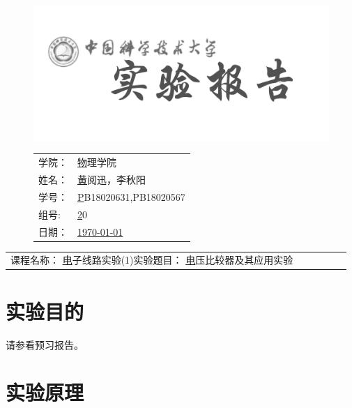 \documentclass[a4paper,11pt,UTF8]{ctexart}
\newcommand{\major}{物理学院}
\newcommand{\name}{黄阅迅，李秋阳}
\newcommand{\stuid}{PB18020631,PB18020567}
\newcommand{\group}{20}
\newcommand{\newdate}{\today}
\newcommand{\course}{电子线路实验(1)}
\newcommand{\newtitle}{电压比较器及其应用实验}
\begin{document}
\thispagestyle{empty}
\begin{figure}[h]
  \begin{minipage}{0.6\linewidth}
    \centerline{\includegraphics[width=\linewidth]{logo.png}}
  \end{minipage}
  \hfill
  \begin{minipage}{.4\linewidth}
    \raggedleft
    \begin{tabular*}{.8\linewidth}{ll}
      学院： & \underline\major   \\
      姓名： & \underline\name    \\
      学号： & \underline\stuid   \\
      组号:  & \underline\group   \\
      日期： & \underline\newdate \\
    \end{tabular*}
  \end{minipage}
\end{figure}

\begin{table}[!htbp]
  \centering
  \begin{tabular*}{\linewidth}{llllll}
    课程名称：  \underline\course   \qquad\qquad 实验题目：  \underline\newtitle  
  \end{tabular*}
\end{table}


\section{实验目的}

请参看预习报告。

\section{实验原理}
\end{document}
